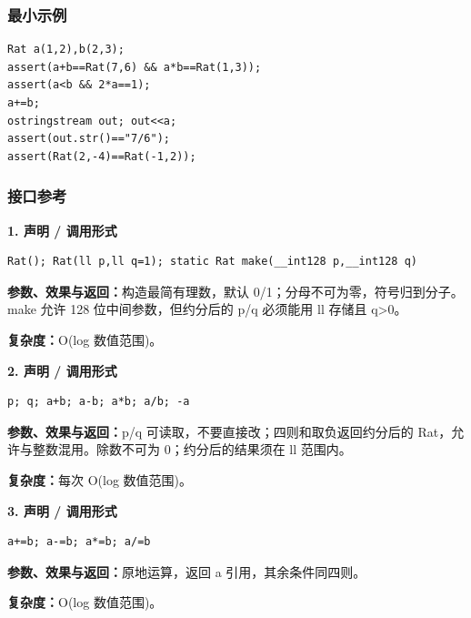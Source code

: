 \documentclass[UTF8,a4paper,10pt]{ctexart}
\begin{document}
\subsubsection*{最小示例}
\begin{lstlisting}
Rat a(1,2),b(2,3);
assert(a+b==Rat(7,6) && a*b==Rat(1,3));
assert(a<b && 2*a==1);
a+=b;
ostringstream out; out<<a;
assert(out.str()=="7/6");
assert(Rat(2,-4)==Rat(-1,2));
\end{lstlisting}
\subsubsection*{接口参考}
\noindent\begin{minipage}{\textwidth}
\textbf{1. 声明 / 调用形式}
\begin{lstlisting}
Rat(); Rat(ll p,ll q=1); static Rat make(__int128 p,__int128 q)
\end{lstlisting}
\textbf{参数、效果与返回：}构造最简有理数，默认 0/1；分母不可为零，符号归到分子。make 允许 128 位中间参数，但约分后的 p/q 必须能用 ll 存储且 q>0。

\textbf{复杂度：}O(log 数值范围)。

\end{minipage}\par\vspace{0.4em}
\noindent\begin{minipage}{\textwidth}
\textbf{2. 声明 / 调用形式}
\begin{lstlisting}
p; q; a+b; a-b; a*b; a/b; -a
\end{lstlisting}
\textbf{参数、效果与返回：}p/q 可读取，不要直接改；四则和取负返回约分后的 Rat，允许与整数混用。除数不可为 0；约分后的结果须在 ll 范围内。

\textbf{复杂度：}每次 O(log 数值范围)。

\end{minipage}\par\vspace{0.4em}
\noindent\begin{minipage}{\textwidth}
\textbf{3. 声明 / 调用形式}
\begin{lstlisting}
a+=b; a-=b; a*=b; a/=b
\end{lstlisting}
\textbf{参数、效果与返回：}原地运算，返回 a 引用，其余条件同四则。

\textbf{复杂度：}O(log 数值范围)。

\end{minipage}\par\vspace{0.4em}
\end{document}
